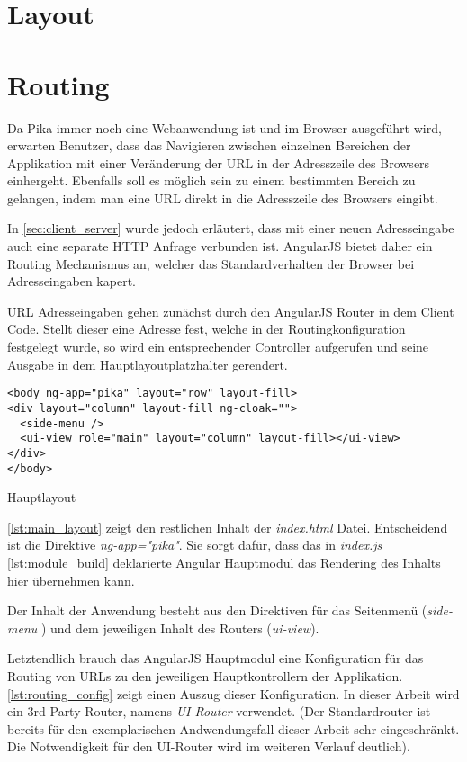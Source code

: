 \section{Layout}

\section{Routing}

Da Pika immer noch eine Webanwendung ist und im Browser ausgeführt wird, erwarten Benutzer, dass das Navigieren zwischen einzelnen Bereichen der Applikation mit einer Veränderung der URL in der Adresszeile des Browsers einhergeht. Ebenfalls soll es möglich sein zu einem bestimmten Bereich zu gelangen, indem man eine URL direkt in die Adresszeile des Browsers eingibt.

In \ref{sec:client_server} wurde jedoch erläutert, dass mit einer neuen Adresseingabe auch eine separate HTTP Anfrage verbunden ist. AngularJS bietet daher ein Routing Mechanismus an, welcher das Standardverhalten der Browser bei Adresseingaben kapert. 

URL Adresseingaben gehen zunächst durch den AngularJS Router in dem Client Code. Stellt dieser eine Adresse fest, welche in der Routingkonfiguration festgelegt wurde, so wird ein entsprechender Controller aufgerufen und seine Ausgabe in dem Hauptlayoutplatzhalter gerendert. 


\begin{listing}[H]
\begin{verbatim}
<body ng-app="pika" layout="row" layout-fill>
<div layout="column" layout-fill ng-cloak="">
  <side-menu />
  <ui-view role="main" layout="column" layout-fill></ui-view>
</div>
</body>
\end{verbatim}
\caption{Hauptlayout}
\label{lst:main_layout}
\end{listing}

\ref{lst:main_layout} zeigt den restlichen Inhalt der \textit{index.html} Datei. Entscheidend ist die Direktive \textit{ng-app="pika"}. Sie sorgt dafür, dass das in \textit{index.js} \ref{lst:module_build} deklarierte Angular Hauptmodul das Rendering des Inhalts hier übernehmen kann.

Der Inhalt der Anwendung besteht aus den Direktiven für das Seitenmenü (\textit{side-menu} ) und dem jeweiligen Inhalt des Routers (\textit{ui-view}). 

Letztendlich brauch das AngularJS Hauptmodul eine Konfiguration für das Routing von URLs zu den jeweiligen Hauptkontrollern der Applikation. \ref{lst:routing_config} zeigt einen Auszug dieser  
Konfiguration. In dieser Arbeit wird ein 3rd Party Router, namens \textit{UI-Router} verwendet.
(Der Standardrouter ist bereits für den exemplarischen Andwendungsfall dieser Arbeit sehr eingeschränkt. Die Notwendigkeit für den UI-Router wird im weiteren Verlauf deutlich).

